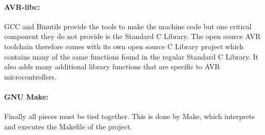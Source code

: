 \paragraph{AVR-libc:} GCC and Binutils provide the tools to make the machine code but one critical component they do not provide is the Standard C Library. The open source AVR toolchain therefore comes with its own open source C Library project which contains many of the same functions found in the regular Standard C Library. It also adds many additional library functions that are specific to  AVR microcontrollers.
\paragraph{GNU Make:} Finally all pieces must be tied together. This is done by Make, which interprets and executes the Makefile of the project.
